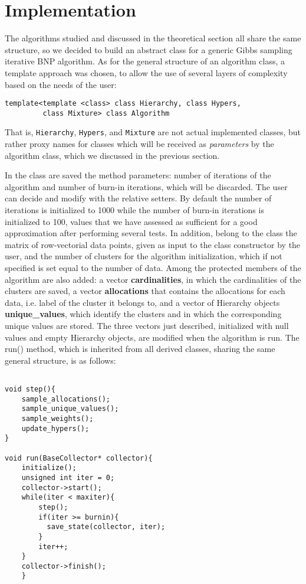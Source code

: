 \chapter{Implementation}

The algorithms studied and discussed in the theoretical section all share the same structure, so we decided to build an abstract class for a generic Gibbs sampling iterative BNP algorithm.
As for the general structure of an algorithm class, a template approach was chosen, to allow the use of several layers of complexity based on the needs of the user:
\begin{verbatim}
template<template <class> class Hierarchy, class Hypers,
         class Mixture> class Algorithm
\end{verbatim}
That is, \verb|Hierarchy|, \verb|Hypers|, and \verb|Mixture| are not actual implemented classes, but rather proxy names for classes which will be received as \emph{parameters} by the algorithm class, which we discussed in the previous section.

In the class are saved the method parameters: number of iterations of the algorithm and number of burn-in iterations, which will be discarded. The user can decide and modify with the relative setters. By default the number of iterations is initialized to 1000 while the number of burn-in iterations is initialized to 100, values that we have assessed as sufficient for a good approximation after performing several tests. In addition, belong to the class the matrix of row-vectorial data points, given as input to the class constructor by the user, and the number of clusters for the algorithm initialization, which if not specified is set equal to the number of data.
Among the protected members of the algorithm are also added:
a vector \textbf{cardinalities}, in which the cardinalities of the clusters are saved, a vector \textbf{allocations} that contains the allocations for each data, i.e. label of the cluster it belongs to, and a vector of Hierarchy objects \textbf{unique\_values}, which identify the clusters and in which the corresponding unique values are stored.
The three vectors just described, initialized with null values and empty Hierarchy objects, are modified when the algorithm is run.
The run() method, which is inherited from all derived classes, sharing the same general structure, is as follows:

\begin{verbatim}

void step(){
    sample_allocations();
    sample_unique_values();
    sample_weights();
    update_hypers();
}

void run(BaseCollector* collector){
    initialize();
    unsigned int iter = 0;
    collector->start();
    while(iter < maxiter){
        step();
        if(iter >= burnin){
          save_state(collector, iter);
        }
        iter++;
    }
    collector->finish();
    }
    
\end{verbatim}

